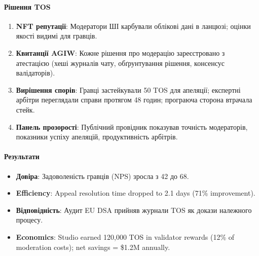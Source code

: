 \documentclass[11pt]{article}
\begin{document}
\paragraph{Рішення TOS}
\begin{enumerate}[noitemsep]
  \item \textbf{NFT репутації}: Модератори ШІ карбували облікові дані в ланцюзі; оцінки якості видимі для гравців.
  \item \textbf{Квитанції AGIW}: Кожне рішення про модерацію зареєстровано з атестацією (хеші журналів чату, обґрунтування рішення, консенсус валідаторів).
  \item \textbf{Вирішення спорів}: Гравці застейкували 50 TOS для апеляції; експертні арбітри переглядали справи протягом 48 годин; програюча сторона втрачала стейк.
  \item \textbf{Панель прозорості}: Публічний провідник показував точність модераторів, показники успіху апеляцій, продуктивність арбітрів.
\end{enumerate}

\paragraph{Результати}
\begin{itemize}[noitemsep]
  \item \textbf{Довіра}: Задоволеність гравців (NPS) зросла з 42 до 68.
  \item \textbf{Efficiency}: Appeal resolution time dropped to 2.1 days (71\% improvement).
  \item \textbf{Відповідність}: Аудит EU DSA прийняв журнали TOS як докази належного процесу.
  \item \textbf{Economics}: Studio earned 120,000 TOS in validator rewards (12\% of moderation costs); net savings = \$1.2M annually.
\end{itemize}
\end{document}
